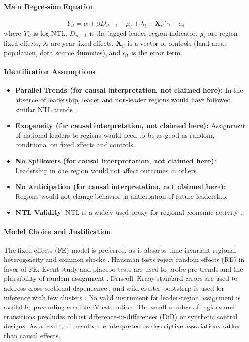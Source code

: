 \documentclass[12pt,a4paper]{article}
\begin{document}
\paragraph{Main Regression Equation}
\begin{equation}
Y_{it} = \alpha + \beta D_{it-1} + \mu_i + \lambda_t + \mathbf{X}_{it}'\gamma + \epsilon_{it}
\end{equation}
\noindent
where $Y_{it}$ is log NTL, $D_{it-1}$ is the lagged leader-region indicator, $\mu_i$ are region fixed effects, $\lambda_t$ are year fixed effects, $\mathbf{X}_{it}$ is a vector of controls (land area, population, data source dummies), and $\epsilon_{it}$ is the error term.

\paragraph{Identification Assumptions}
\begin{itemize}
	\item \textbf{Parallel Trends (for causal interpretation, not claimed here):} In the absence of leadership, leader and non-leader regions would have followed similar NTL trends \citep{Angrist2009}.
	\item \textbf{Exogeneity (for causal interpretation, not claimed here):} Assignment of national leaders to regions would need to be as good as random, conditional on fixed effects and controls.
	\item \textbf{No Spillovers (for causal interpretation, not claimed here):} Leadership in one region would not affect outcomes in others.
	\item \textbf{No Anticipation (for causal interpretation, not claimed here):} Regions would not change behavior in anticipation of future leadership.
	\item \textbf{NTL Validity:} NTL is a widely used proxy for regional economic activity \citep{Chen2011, Henderson2012, Gibson2021}.
\end{itemize}

\paragraph{Model Choice and Justification}
The fixed effects (FE) model is preferred, as it absorbs time-invariant regional heterogeneity and common shocks \citep{Wooldridge2010, AngristPischke2009}. Hausman tests reject random effects (RE) in favor of FE. Event-study and placebo tests are used to probe pre-trends and the plausibility of random assignment \citep{JacobsonLaLondeSullivan1993, ClarkeSchythe2021}. Driscoll--Kraay standard errors are used to address cross-sectional dependence \citep{DriscollKraay1998}, and wild cluster bootstrap is used for inference with few clusters \citep{CameronGelbachMiller2008}. No valid instrument for leader-region assignment is available, precluding credible IV estimation. The small number of regions and transitions precludes robust difference-in-differences (DiD) or synthetic control designs. As a result, all results are interpreted as descriptive associations rather than causal effects.
\end{document}
